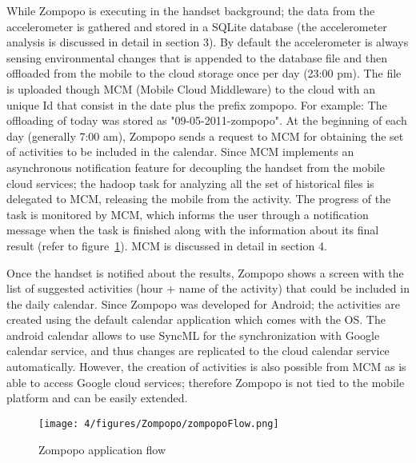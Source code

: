 While Zompopo is executing in the handset background; the data from the accelerometer is gathered and stored in a SQLite database (the accelerometer analysis is discussed in detail in section 3). By default the accelerometer is always sensing environmental changes that is appended to the database file and then offloaded from the mobile to the cloud storage once per day (23:00 pm). The file is uploaded though MCM (Mobile Cloud Middleware) to the cloud with an unique Id that consist in the date plus the prefix zompopo. For example: The offloading of today was stored as "09-05-2011-zompopo". At the beginning of each day (generally 7:00 am), Zompopo sends a request to MCM for obtaining the set of activities to be included in the calendar. Since MCM implements an asynchronous notification feature for decoupling the handset from the mobile cloud services; the hadoop task for analyzing all the set of historical files is delegated to MCM, releasing the mobile from the activity. The progress of the task is monitored by MCM, which informs the user through a notification message when the task is finished along with the information about its final result (refer to figure~\ref{fig:zompopoFlow}). MCM is discussed in detail in section 4.

Once the handset is notified about the results, Zompopo shows a screen with the list of suggested activities (hour + name of the activity) that could be included in the daily calendar. Since Zompopo was developed for Android; the activities are created using the default calendar application which comes with the OS. The android calendar allows to use SyncML for the synchronization with Google calendar service, and thus changes are replicated to the cloud calendar service automatically. However, the creation of activities is also possible from MCM as is able to access Google cloud services; therefore Zompopo is not tied to the mobile platform and can be easily extended.


\begin{figure}
\centering
\texttt{[image: 4/figures/Zompopo/zompopoFlow.png]}
\caption{Zompopo application flow}
\label{fig:zompopoFlow}
\end{figure}

